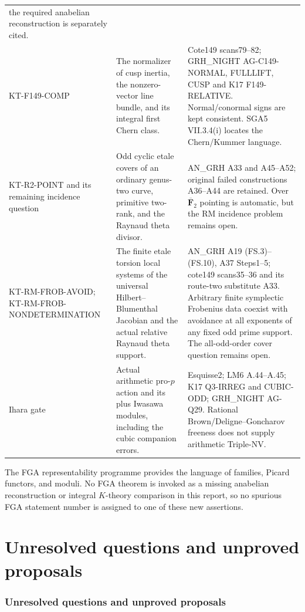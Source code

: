 \documentclass[11pt,a4paper]{article}
\theoremstyle{definition}
\begin{document}
\begin{longtable}{>{\raggedright\arraybackslash}p{}
>{\raggedright\arraybackslash}p{}
>{\raggedright\arraybackslash}p{}}
the required anabelian reconstruction is separately cited.\\
KT-F149-COMP &
The normalizer of cusp inertia, the nonzero-vector line bundle,
and its integral first Chern class. &
Cote149 scans79--82; GRH\_NIGHT AG-C149-NORMAL, FULLLIFT,
CUSP and K17 F149-RELATIVE. Normal/conormal signs are kept
consistent. SGA5 VII.3.4(i) locates the Chern/Kummer language.\\
KT-R2-POINT and its remaining incidence question &
Odd cyclic etale covers of an ordinary genus-two curve,
primitive two-rank, and the Raynaud theta divisor. &
AN\_GRH A33 and A45--A52; original failed constructions
A36--A44 are retained. Over $\overline{\mathbf F}_2$ pointing
is automatic, but the RM incidence problem remains open.\\
KT-RM-FROB-AVOID; KT-RM-FROB-NONDETERMINATION &
The finite etale torsion local systems of the universal
Hilbert--Blumenthal Jacobian and the actual relative
Raynaud theta support. &
AN\_GRH A19 (FS.3)--(FS.10), A37 Steps1--5;
cote149 scans35--36 and its route-two substitute A33.
Arbitrary finite symplectic Frobenius data coexist with
avoidance at all exponents of any fixed odd prime support.
The all-odd-order cover question remains open.\\
Ihara gate &
Actual arithmetic pro-$p$ action and its plus Iwasawa modules,
including the cubic companion errors. &
Esquisse2; LM6 A.44--A.45; K17 Q3-IRREG and CUBIC-ODD;
GRH\_NIGHT AG-Q29. Rational Brown/Deligne--Goncharov
freeness does not supply arithmetic Triple-NV.\\
\bottomrule
\end{longtable}
\normalsize

The FGA representability programme provides the language of
families, Picard functors, and moduli. No FGA theorem is
invoked as a missing anabelian reconstruction or integral
$K$-theory comparison in this report, so no spurious FGA
statement number is assigned to one of these new assertions.


\part{Unresolved questions and unproved proposals}

\section{Unresolved questions and unproved proposals}
\end{document}

